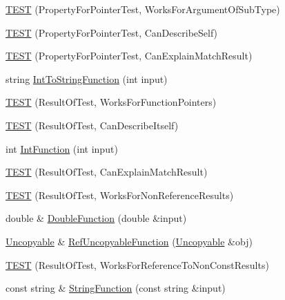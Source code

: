 \begin{DoxyCompactItemize}
\item 
\hyperlink{namespacetesting_1_1gmock__matchers__test_a4c2f4b483550e2e70b09eea3836b83e0}{T\+E\+ST} (Property\+For\+Pointer\+Test, Works\+For\+Argument\+Of\+Sub\+Type)
\item 
\hyperlink{namespacetesting_1_1gmock__matchers__test_a064fc5dd5ca0106e8ed0fbc483472186}{T\+E\+ST} (Property\+For\+Pointer\+Test, Can\+Describe\+Self)
\item 
\hyperlink{namespacetesting_1_1gmock__matchers__test_a1a7e2a9641a06e492d58c75d900330d3}{T\+E\+ST} (Property\+For\+Pointer\+Test, Can\+Explain\+Match\+Result)
\item 
string \hyperlink{namespacetesting_1_1gmock__matchers__test_a2399c4fae49f898c02f57a42047d80f2}{Int\+To\+String\+Function} (int input)
\item 
\hyperlink{namespacetesting_1_1gmock__matchers__test_a5aea17c7d3dd74cbc0cbf181b3a9e5f8}{T\+E\+ST} (Result\+Of\+Test, Works\+For\+Function\+Pointers)
\item 
\hyperlink{namespacetesting_1_1gmock__matchers__test_a1b5240d2272b679d7e3035554c2c5688}{T\+E\+ST} (Result\+Of\+Test, Can\+Describe\+Itself)
\item 
int \hyperlink{namespacetesting_1_1gmock__matchers__test_a6e957b9dcda1186c6274a8895d1514b5}{Int\+Function} (int input)
\item 
\hyperlink{namespacetesting_1_1gmock__matchers__test_ab7fe283b2955ca8bb11b2984a08eef33}{T\+E\+ST} (Result\+Of\+Test, Can\+Explain\+Match\+Result)
\item 
\hyperlink{namespacetesting_1_1gmock__matchers__test_a86f01e29ee48050d401fceca21d1041e}{T\+E\+ST} (Result\+Of\+Test, Works\+For\+Non\+Reference\+Results)
\item 
double \& \hyperlink{namespacetesting_1_1gmock__matchers__test_a48350ba4c1ce65694ec07e9c1c49a452}{Double\+Function} (double \&input)
\item 
\hyperlink{classtesting_1_1gmock__matchers__test_1_1Uncopyable}{Uncopyable} \& \hyperlink{namespacetesting_1_1gmock__matchers__test_aa6f7dd285163d5880cfd6685bec8cab4}{Ref\+Uncopyable\+Function} (\hyperlink{classtesting_1_1gmock__matchers__test_1_1Uncopyable}{Uncopyable} \&obj)
\item 
\hyperlink{namespacetesting_1_1gmock__matchers__test_a505e866c4066d27854cb6754c66a3eec}{T\+E\+ST} (Result\+Of\+Test, Works\+For\+Reference\+To\+Non\+Const\+Results)
\item 
const string \& \hyperlink{namespacetesting_1_1gmock__matchers__test_a5fdf1ecaf8e8e8ef5d57c311e675841d}{String\+Function} (const string \&input)

\end{DoxyCompactItemize}
